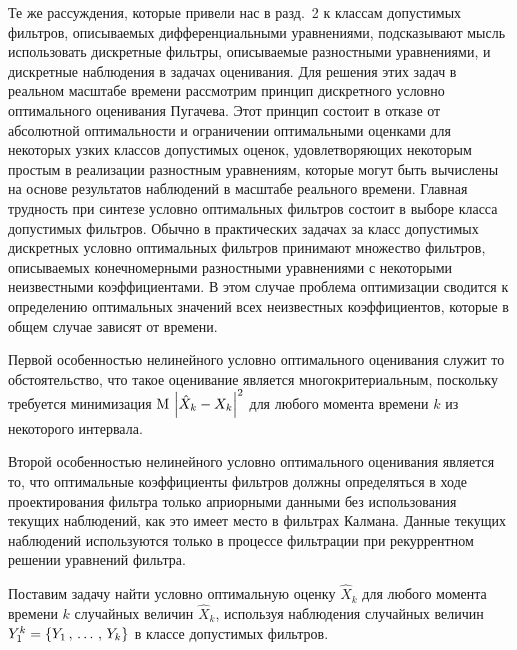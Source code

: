 \begin{multicols}{2}
Те же рассуждения, которые привели нас в разд.~2 к классам
допустимых фильтров, описы\-ва\-емых дифференциальными уравнениями,
подсказывают мысль использовать дискретные фильтры, описываемые
разностными уравнениями, и дискретные наблюдения в задачах
оценивания. Для решения этих задач в реальном масштабе времени
рассмотрим принцип дискретного условно оптимального оценивания
Пугачева. Этот принцип состоит в отказе от абсолютной
оптимальности и ограничении оптимальными оценками для некоторых
узких классов допустимых оценок, удовлетворяющих некоторым
простым в реализации разностным уравнениям, которые могут быть
вычислены на основе результатов наблюдений в масштабе реального
времени. Главная трудность при синтезе условно оптимальных
фильтров состоит в выборе класса допустимых фильтров. Обычно в
практических задачах за класс допустимых дискретных условно
оптимальных фильтров принимают множество фильтров, описываемых
конечномерными разностными уравнениями с некоторыми неизвестными
коэффициентами. В этом случае проблема оптимизации сводится к
определению оптимальных значений всех неизвестных коэффициентов,
которые в общем случае зависят от времени.

Первой особенностью нелинейного условно оптимального оценивания
служит то обстоятельство, что такое оценивание является
многокритериальным, поскольку требуется минимизация  ${\rm M} \,\left\vert
\hat X_k - X_k\right\vert^2$ для любого момента времени $k$ из некоторого
интервала.

Второй особенностью нелинейного условно оптимального оценивания
является то, что оптимальные коэффициенты фильтров должны
определяться в ходе проектирования фильтра только априорными
данными без использования текущих наблюдений, как это имеет место
в фильтрах Калмана. Данные текущих наблюдений используются только
в процессе фильтрации при рекуррентном решении уравнений фильтра.

Поставим задачу найти условно оптимальную оценку $\hat X_k$ для
любого момента времени $k$ случайных величин $\hat X_k$, используя
наблюдения случайных величин $Y_1^k = \left\{ Y_1\,,\,\ldots\,,\, Y_k\right\}$ в классе
допустимых фильтров.


\end{multicols}
